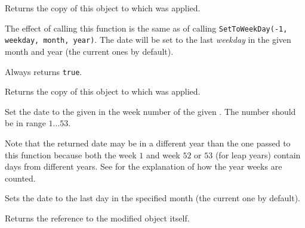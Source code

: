 Returns the copy of this object to which
 was applied.


\label{wxdatetimesettolastweekday}


The effect of calling this function is the same as of calling
{\tt SetToWeekDay(-1, weekday, month, year)}. The date will be set to the last
{\it weekday} in the given month and year (the current ones by default).

Always returns {\tt true}.


\label{wxdatetimegetlastweekday}


Returns the copy of this object to which
 was applied.


\label{wxdatetimesettoweekofyear}


Set the date to the given  in the week number  of the
given  . The number should be in range $1\ldots53$.

Note that the returned date may be in a different year than the one passed to
this function because both the week $1$ and week $52$ or $53$ (for leap years)
contain days from different years. See
 for the explanation of how the
year weeks are counted.


\label{wxdatetimesettolastmonthday}


Sets the date to the last day in the specified month (the current one by
default).

Returns the reference to the modified object itself.


\label{wxdatetimegetlastmonthday}

